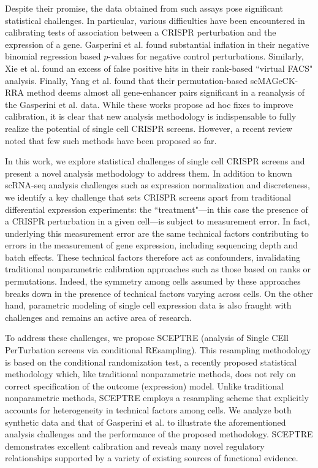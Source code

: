 \documentclass{nature}
\begin{document}
Despite their promise, the data obtained from such assays pose significant statistical challenges. In particular, various difficulties have been encountered in calibrating tests of association between a CRISPR perturbation and the expression of a gene. Gasperini et al.\cite{Gasperini2019} found substantial inflation in their negative binomial regression based $p$-values for negative control perturbations. Similarly, Xie et al.\cite{Xie2019} found an excess of false positive hits in their rank-based ``virtual FACS" analysis. Finally, Yang et al.\cite{Yang2020} found that their permutation-based scMAGeCK-RRA method deems almost all gene-enhancer pairs significant in a reanalysis of the Gasperini et al. data. While these works propose ad hoc fixes to improve calibration, it is clear that new analysis methodology is indispensable to fully realize the potential of single cell CRISPR screens. However, a recent review\cite{Lin2020} noted that few such methods have been proposed so far. 

In this work, we explore statistical challenges of single cell CRISPR screens and present a novel analysis methodology to address them. In addition to known scRNA-seq analysis challenges such as expression normalization and discreteness\cite{Townes2019,Hafemeister2019,Svensson2020}, we identify a key challenge that sets CRISPR screens apart from traditional differential expression experiments: the ``treatment"---in this case the presence of a CRISPR perturbation in a given cell---is subject to measurement error\cite{Dixit2016,Hill2018,Replogle2020}. In fact, underlying this measurement error are the same technical factors contributing to errors in the measurement of gene expression, including sequencing depth and batch effects. These technical factors therefore act as confounders, invalidating traditional nonparametric calibration approaches such as those based on ranks or permutations. Indeed, the symmetry among cells assumed by these approaches breaks down in the presence of technical factors varying across cells. On the other hand, parametric modeling of single cell expression data is also fraught with challenges and remains an active area of research.

To address these challenges, we propose SCEPTRE (analysis of Single CEll PerTurbation screens via conditional REsampling). This resampling methodology is based on the conditional randomization test\cite{CetL16}, a recently proposed statistical methodology which, like traditional nonparametric methods, does not rely on correct specification of the outcome (expression) model. Unlike traditional nonparametric methods, SCEPTRE employs a resampling scheme that explicitly accounts for heterogeneity in technical factors among cells. We analyze both synthetic data and that of Gasperini et al.\cite{Gasperini2019} to illustrate the aforementioned analysis challenges and the performance of the proposed methodology. SCEPTRE demonstrates excellent calibration and reveals many novel regulatory relationships supported by a variety of existing sources of functional evidence.
\end{document}
